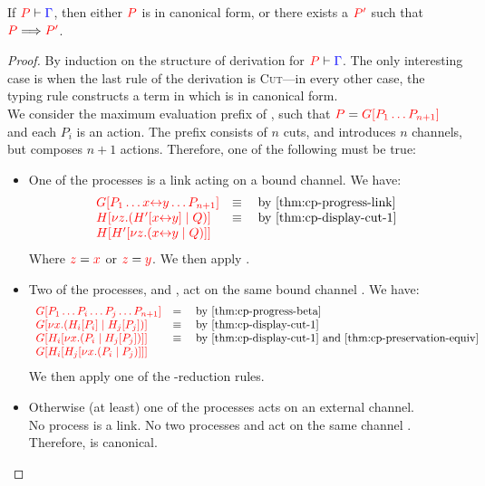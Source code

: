 \begin{theorem}[Progress]\label{thm:cp-progress-3}
  If $\seq[{ P }]{ \Gamma }$, then either $\tm{P}$ is in canonical form, or
  there exists a $\tm{P'}$ such that $\reducesto{P}{P'}$. 
\end{theorem}
\begin{proof}
  By induction on the structure of derivation for $\seq[{ P }]{ \Gamma }$.
  The only interesting case is when the last rule of the derivation is
  \textsc{Cut}---in every other case, the typing rule constructs a term in which 
  is in canonical form. 
  \\
  We consider the maximum evaluation prefix  of , such that $\tm{P}
  = \tm{\cpPlug{G}{P_1 \dots P_{n+1}}}$ and each $P_i$ is an action.
  The prefix  consists of $n$ cuts, and introduces $n$ channels, but
  composes $n+1$ actions. Therefore, one of the following must be true:
  \begin{itemize}
  \item
    One of the processes is a link  acting on a bound channel.
    We have:
    \begin{gather*}
      \begin{array}{ll}
        \tm{\cpPlug{G}{P_1 \dots \cpLink{x}{y} \dots P_{n+1}}}
        & \equiv \quad \text{by \cref{thm:cp-progress-link}}
        \\
        \tm{\cpPlug{H}{\cpCut{z}{\cpPlug{H'}{\cpLink{x}{y}}}{Q}}}
        & \equiv \quad \text{by \cref{thm:cp-display-cut-1}}
        \\
        \tm{\cpPlug{H}{\cpPlug{H'}{\cpCut{z}{\cpLink{x}{y}}{Q}}}}
      \end{array}
    \end{gather*}
    Where $\tm{z} = \tm{x}$ or $\tm{z} = \tm{y}$.
    We then apply .
  \item
    Two of the processes,  and , act on the same bound channel
    . We have:
    \begin{gather*}
      \begin{array}{ll}
        \tm{\cpPlug{G}{P_1 \dots P_i \dots P_j \dots P_{n+1}}}
        & = \quad \text{by \cref{thm:cp-progress-beta}}
        \\
        \tm{\cpPlug{G}{\cpCut{x}{\cpPlug{H_i}{P_i}}{\cpPlug{H_j}{P_j}}}}
        & \equiv \quad \text{by \cref{thm:cp-display-cut-1}} 
        \\
        \tm{\cpPlug{G}{\cpPlug{H_i}{\cpCut{x}{P_i}{\cpPlug{H_j}{P_j}}}}}
        & \equiv \quad \text{by \cref{thm:cp-display-cut-1} and
          \cref{thm:cp-preservation-equiv}} 
        \\
        \tm{\cpPlug{G}{\cpPlug{H_i}{\cpPlug{H_j}{\cpCut{x}{P_i}{P_j}}}}} 
      \end{array}
    \end{gather*}
    We then apply one of the \textbeta-reduction rules.
  \item
    Otherwise (at least) one of the processes acts on an external channel.
    \\
    No process  is a link.
    No two processes  and  act on the same channel .
    Therefore,  is canonical.
  \end{itemize}
\end{proof}
